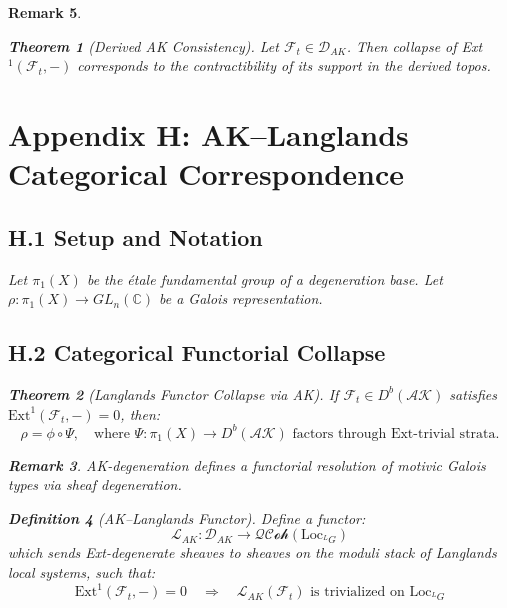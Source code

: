 \documentclass[11pt]{article}
\newtheorem{theorem}{Theorem}[section]
\newtheorem{definition}[theorem]{Definition}
\newtheorem{remark}[theorem]{Remark}
\begin{document}
\begin{remark}
\begin{theorem}[Derived AK Consistency]
Let \( \mathcal{F}_t \in \mathcal{D}_{AK} \). Then collapse of Ext$^1(\mathcal{F}_t, -)$ corresponds to the contractibility of its support in the derived topos.
\end{theorem}

\section*{Appendix H: AK–Langlands Categorical Correspondence}

\subsection*{H.1 Setup and Notation}
Let $\pi_1(X)$ be the étale fundamental group of a degeneration base. Let $\rho: \pi_1(X) \to GL_n(\mathbb{C})$ be a Galois representation.

\subsection*{H.2 Categorical Functorial Collapse}

\begin{theorem}[Langlands Functor Collapse via AK]
If $\mathcal{F}_t \in D^b(\mathcal{AK})$ satisfies $\mathrm{Ext}^1(\mathcal{F}_t, -) = 0$, then:
\[
\rho = \phi \circ \Psi, \quad \text{where } \Psi: \pi_1(X) \to D^b(\mathcal{AK}) \text{ factors through Ext-trivial strata.}
\]
\end{theorem}

\begin{remark}
AK-degeneration defines a functorial resolution of motivic Galois types via sheaf degeneration.
\end{remark}

\begin{definition}[AK–Langlands Functor]
Define a functor:
\[
\mathcal{L}_{AK} : \mathcal{D}_{AK} \longrightarrow \mathcal{QCoh}(\mathrm{Loc}_{^LG})
\]
which sends Ext-degenerate sheaves to sheaves on the moduli stack of Langlands local systems, such that:
\[
\mathrm{Ext}^1(\mathcal{F}_t, -) = 0 \quad \Rightarrow \quad \mathcal{L}_{AK}(\mathcal{F}_t) \text{ is trivialized on } \mathrm{Loc}_{^LG}
\]
\end{definition}


\end{remark}
\end{document}
